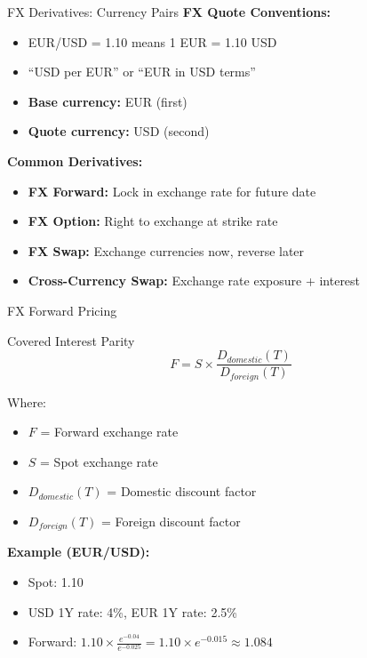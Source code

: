 \documentclass[aspectratio=169,11pt]{beamer}
\begin{document}
\begin{frame}{FX Derivatives: Currency Pairs}
\textbf{FX Quote Conventions:}
\begin{itemize}
    \item EUR/USD = 1.10 means 1 EUR = 1.10 USD
    \item ``USD per EUR'' or ``EUR in USD terms''
    \item \textbf{Base currency:} EUR (first)
    \item \textbf{Quote currency:} USD (second)
\end{itemize}

\textbf{Common Derivatives:}
\begin{itemize}
    \item \textbf{FX Forward:} Lock in exchange rate for future date
    \item \textbf{FX Option:} Right to exchange at strike rate
    \item \textbf{FX Swap:} Exchange currencies now, reverse later
    \item \textbf{Cross-Currency Swap:} Exchange rate exposure + interest
\end{itemize}
\end{frame}

\begin{frame}{FX Forward Pricing}
\begin{block}{Covered Interest Parity}
\[
F = S \times \frac{D_{domestic}(T)}{D_{foreign}(T)}
\]
\end{block}

Where:
\begin{itemize}
    \item $F$ = Forward exchange rate
    \item $S$ = Spot exchange rate
    \item $D_{domestic}(T)$ = Domestic discount factor
    \item $D_{foreign}(T)$ = Foreign discount factor
\end{itemize}

\textbf{Example (EUR/USD):}
\begin{itemize}
    \item Spot: 1.10
    \item USD 1Y rate: 4\%, EUR 1Y rate: 2.5\%
    \item Forward: $1.10 \times \frac{e^{-0.04}}{e^{-0.025}} = 1.10 \times e^{-0.015} \approx 1.084$
\end{itemize}
\end{frame}
\end{document}
